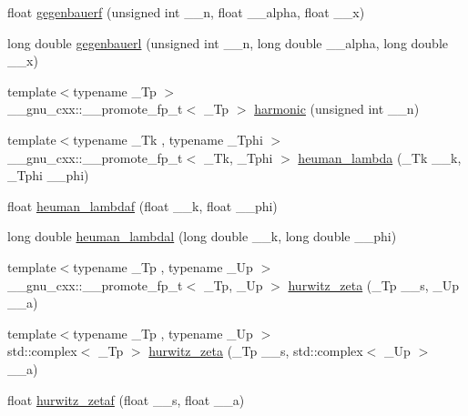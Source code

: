 \begin{DoxyCompactItemize}
\item 
float \hyperlink{group__gnu__math__spec__func_ga0f16dd9c771c8c177f377381b6e3387c}{gegenbauerf} (unsigned int \+\_\+\+\_\+n, float \+\_\+\+\_\+alpha, float \+\_\+\+\_\+x)
\item 
long double \hyperlink{group__gnu__math__spec__func_gabf1644841deefbb162ade9fa508591cb}{gegenbauerl} (unsigned int \+\_\+\+\_\+n, long double \+\_\+\+\_\+alpha, long double \+\_\+\+\_\+x)
\item 
{\footnotesize template$<$typename \+\_\+\+Tp $>$ }\\\+\_\+\+\_\+gnu\+\_\+cxx\+::\+\_\+\+\_\+promote\+\_\+fp\+\_\+t$<$ \+\_\+\+Tp $>$ \hyperlink{group__gnu__math__spec__func_gacfed8c7fa783d1a49c03de96e80bbdc1}{harmonic} (unsigned int \+\_\+\+\_\+n)
\item 
{\footnotesize template$<$typename \+\_\+\+Tk , typename \+\_\+\+Tphi $>$ }\\\+\_\+\+\_\+gnu\+\_\+cxx\+::\+\_\+\+\_\+promote\+\_\+fp\+\_\+t$<$ \+\_\+\+Tk, \+\_\+\+Tphi $>$ \hyperlink{group__gnu__math__spec__func_gab73b2a75a662785fa102926dca3be59f}{heuman\+\_\+lambda} (\+\_\+\+Tk \+\_\+\+\_\+k, \+\_\+\+Tphi \+\_\+\+\_\+phi)
\item 
float \hyperlink{group__gnu__math__spec__func_ga10cf5d54d985aa3a58cb197601040ac8}{heuman\+\_\+lambdaf} (float \+\_\+\+\_\+k, float \+\_\+\+\_\+phi)
\item 
long double \hyperlink{group__gnu__math__spec__func_gadadaeb83b3d9c2fccd33ab8ec3188df5}{heuman\+\_\+lambdal} (long double \+\_\+\+\_\+k, long double \+\_\+\+\_\+phi)
\item 
{\footnotesize template$<$typename \+\_\+\+Tp , typename \+\_\+\+Up $>$ }\\\+\_\+\+\_\+gnu\+\_\+cxx\+::\+\_\+\+\_\+promote\+\_\+fp\+\_\+t$<$ \+\_\+\+Tp, \+\_\+\+Up $>$ \hyperlink{group__gnu__math__spec__func_ga19b3014d94dd102c59a5c7776474be41}{hurwitz\+\_\+zeta} (\+\_\+\+Tp \+\_\+\+\_\+s, \+\_\+\+Up \+\_\+\+\_\+a)
\item 
{\footnotesize template$<$typename \+\_\+\+Tp , typename \+\_\+\+Up $>$ }\\std\+::complex$<$ \+\_\+\+Tp $>$ \hyperlink{group__gnu__math__spec__func_gaa7f0d1fbba9d2ce07a30d907302d527f}{hurwitz\+\_\+zeta} (\+\_\+\+Tp \+\_\+\+\_\+s, std\+::complex$<$ \+\_\+\+Up $>$ \+\_\+\+\_\+a)
\item 
float \hyperlink{group__gnu__math__spec__func_gaa745d7f2edde060ed2f22817ad89df1f}{hurwitz\+\_\+zetaf} (float \+\_\+\+\_\+s, float \+\_\+\+\_\+a)
\item 

\end{DoxyCompactItemize}
